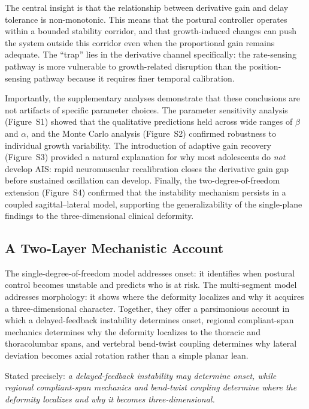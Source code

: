 \documentclass[12pt,a4paper]{article}
\begin{document}
The central insight is that the relationship between derivative gain and delay tolerance is non-monotonic. This means that the postural controller operates within a bounded stability corridor, and that growth-induced changes can push the system outside this corridor even when the proportional gain remains adequate. The ``trap'' lies in the derivative channel specifically: the rate-sensing pathway is more vulnerable to growth-related disruption than the position-sensing pathway because it requires finer temporal calibration.

Importantly, the supplementary analyses demonstrate that these conclusions are not artifacts of specific parameter choices. The parameter sensitivity analysis (Figure~S1) showed that the qualitative predictions held across wide ranges of $\beta$ and $\alpha$, and the Monte Carlo analysis (Figure~S2) confirmed robustness to individual growth variability. The introduction of adaptive gain recovery (Figure~S3) provided a natural explanation for why most adolescents do \textit{not} develop AIS: rapid neuromuscular recalibration closes the derivative gain gap before sustained oscillation can develop. Finally, the two-degree-of-freedom extension (Figure~S4) confirmed that the instability mechanism persists in a coupled sagittal--lateral model, supporting the generalizability of the single-plane findings to the three-dimensional clinical deformity.

\subsection{A Two-Layer Mechanistic Account}

The single-degree-of-freedom model addresses onset: it identifies when postural control becomes unstable and predicts who is at risk. The multi-segment model addresses morphology: it shows where the deformity localizes and why it acquires a three-dimensional character. Together, they offer a parsimonious account in which a delayed-feedback instability determines onset, regional compliant-span mechanics determines why the deformity localizes to the thoracic and thoracolumbar spans, and vertebral bend-twist coupling determines why lateral deviation becomes axial rotation rather than a simple planar lean.

Stated precisely: \textit{a delayed-feedback instability may determine onset, while regional compliant-span mechanics and bend-twist coupling determine where the deformity localizes and why it becomes three-dimensional.}
\end{document}
